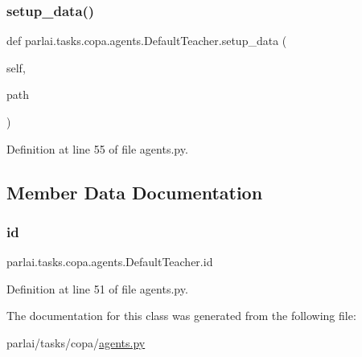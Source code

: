 \subsubsection{\texorpdfstring{setup\+\_\+data()}{setup\_data()}}
{\footnotesize\ttfamily def parlai.\+tasks.\+copa.\+agents.\+Default\+Teacher.\+setup\+\_\+data (\begin{DoxyParamCaption}\item[{}]{self,  }\item[{}]{path }\end{DoxyParamCaption})}



Definition at line 55 of file agents.\+py.



\subsection{Member Data Documentation}
\mbox{\label{classparlai_1_1tasks_1_1copa_1_1agents_1_1DefaultTeacher_aa8f1b5e4b4493e80ed37fd6cb5d3b696}} 
\subsubsection{\texorpdfstring{id}{id}}
{\footnotesize\ttfamily parlai.\+tasks.\+copa.\+agents.\+Default\+Teacher.\+id}



Definition at line 51 of file agents.\+py.



The documentation for this class was generated from the following file\+:\begin{DoxyCompactItemize}
\item 
parlai/tasks/copa/\hyperlink{parlai_2tasks_2copa_2agents_8py}{agents.\+py}\end{DoxyCompactItemize}

